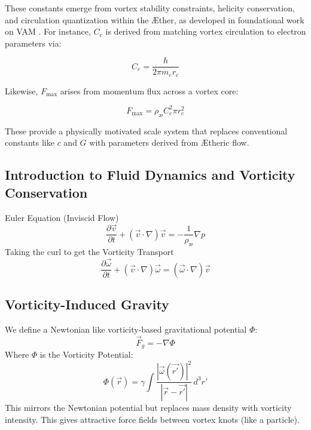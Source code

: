 \documentclass[aps,preprint,superscriptaddress]{revtex4}
\begin{document}
These constants emerge from vortex stability constraints, helicity conservation, and circulation quantization within the Æther, as developed in foundational work on VAM \cite{vam2025field, vam2025unified}. For instance, $C_e$ is derived from matching vortex circulation to electron parameters via:

\[
    C_e = \frac{h}{2\pi m_e r_c}
\]

Likewise, $F_{\text{max}}$ arises from momentum flux across a vortex core:

\[
    F_{\text{max}} = \rho_{\text{\ae}} C_e^2 \pi r_c^2
\]

These provide a physically motivated scale system that replaces conventional constants like $c$ and $G$ with parameters derived from Ætheric flow.


\subsection*{Introduction to Fluid Dynamics and Vorticity Conservation}
    Euler Equation (Inviscid Flow)
    \begin{equation}
        \frac{\partial \vec{v}}{\partial t} + (\vec{v} \cdot \nabla)\vec{v} = -\frac{1}{\rho_\text{æ}} \nabla p
    \end{equation}
    Taking the curl to get the Vorticity Transport
    \begin{equation}
        \frac{\partial \vec{\omega}}{\partial t} + (\vec{v} \cdot \nabla)\vec{\omega} = (\vec{\omega} \cdot \nabla) \vec{v}
    \end{equation}

    \subsection*{Vorticity-Induced Gravity}
    We define a Newtonian like vorticity-based gravitational potential $\Phi$:
    \begin{equation}
        \vec{F}_g = -\nabla \Phi
    \end{equation}
    Where $\Phi$ is the Vorticity Potential:
    \begin{equation}
        \Phi(\vec{r}) = \gamma \int \frac{|\vec{\omega}(\vec{r'})|^2}{|\vec{r} - \vec{r'}|} \, d^3r'
    \end{equation}
    This mirrors the Newtonian potential but replaces mass density with vorticity intensity. This gives attractive force fields between vortex knots (like a particle).
\end{document}
